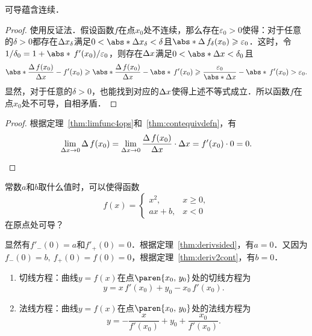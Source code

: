 \begin{theorem}
  \label{thm:deriv2cont}
  可导蕴含连续．

  \begin{proof}
    使用反证法．假设函数\(f\)在点\(x_0\)处不连续，那么存在\(\varepsilon_0 > 0\)使得：对于任意的\(\delta > 0\)都存在\(\mathop{}\!\Delta x_\delta\)满足\(0 < \abs*{\fwdf x_\delta} < \delta\)且\(\abs*{\fwdf\,f_\delta(x_0)} \ge \varepsilon_0\)．这时，令\(1/\delta_0 = 1 + \abs*{\,f'(x_0)}/\varepsilon_0\)，则存在\(\mathop{}\!\Delta x\)满足\(0 < \abs*{\fwdf x} < \delta_0\)且
    \begin{equation*}
      \abs*{\frac{\fwdf\,f(x_0)}{\fwdf x} - f'(x_0)}
      \ge \abs*{\frac{\fwdf\,f(x_0)}{\fwdf x}} - \abs*{\,f'(x_0)}
      \ge \frac{\varepsilon_0}{\abs*{\fwdf x}} - \abs*{\,f'(x_0)}
      > \varepsilon_0.
    \end{equation*}
    显然，对于任意的\(\delta > 0\)，也能找到对应的\(\mathop{}\!\Delta x\)使得上述不等式成立．所以函数\(f\)在点\(x_0\)处不可导，自相矛盾．
  \end{proof}
  \begin{proof}
    根据定理~\ref{thm:limfunc4ops}和~\ref{thm:contequivdefn}，有
    \begin{equation*}
      \lim_{\fwdf x \to 0} \fwdf\,f(x_0)
      = \lim_{\fwdf x \to 0} \frac{\fwdf\,f(x_0)}{\fwdf x} \cdot \fwdf x
      = f'(x_0) \cdot 0 = 0. \rule[-2.5ex]{0ex}{0ex}
      \qedhere
    \end{equation*}
  \end{proof}
\end{theorem}

\begin{example*}
  常数\(a\)和\(b\)取什么值时，可以使得函数
  \begin{equation*}
    f(x) =
    \begin{cases}
      x^2, & x \ge 0, \\
      ax+b, & x < 0
    \end{cases}
  \end{equation*}
  在原点处可导？

  \begin{remark}
    显然有\(f'_-(0) = a\)和\(f'_+(0) = 0\)．根据定理~\ref{thm:derivsided}，有\(a = 0\)．又因为\(f_-(0) = b,\ f_+(0) = f(0) = 0\)，根据定理~\ref{thm:deriv2cont}，有\(b = 0\)．
  \end{remark}
\end{example*}

\begin{remark}[导数的几何意义]
  \label{rem:derivgeom}
  \leavevmode
  \begin{enumerate}
  \item 切线方程：曲线\(y = f(x)\)在点\(\paren{x_0, \,y_0}\)处的切线方程为
    \begin{equation*}
      y = x\,f'(x_0) + y_0 - x_0\,f'(x_0).
    \end{equation*}
  \item 法线方程：曲线\(y = f(x)\)在点\(\paren{x_0, \,y_0}\)处的法线方程为
    \begin{equation*}
      y = - \frac{x}{f'(x_0)} + y_0 + \frac{x_0}{f'(x_0)}.
    \end{equation*}
  \end{enumerate}
\end{remark}

